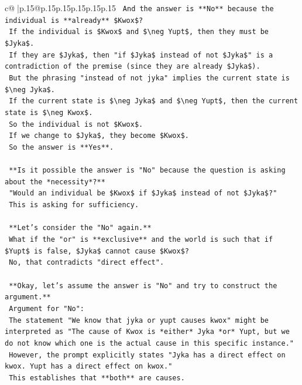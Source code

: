 \documentclass{article}
\begin{document}
{\begin{supertabular}{c@{$\;$}|p{.15\linewidth}@{}p{.15\linewidth}p{.15\linewidth}p{.15\linewidth}p{.15\linewidth}p{.15\linewidth}}
{{{\texttt{    And the answer is **No** because the individual is **already** \$Kwox\$?} \\
\texttt{    If the individual is \$Kwox\$ and \$\textbackslash{}neg Yupt\$, then they must be \$Jyka\$.} \\
\texttt{    If they are \$Jyka\$, then "if \$Jyka\$ instead of not \$Jyka\$" is a contradiction of the premise (since they are already \$Jyka\$).} \\
\texttt{    But the phrasing "instead of not jyka" implies the current state is \$\textbackslash{}neg Jyka\$.} \\
\texttt{    If the current state is \$\textbackslash{}neg Jyka\$ and \$\textbackslash{}neg Yupt\$, then the current state is \$\textbackslash{}neg Kwox\$.} \\
\texttt{    So the individual is not \$Kwox\$.} \\
\texttt{    If we change to \$Jyka\$, they become \$Kwox\$.} \\
\texttt{    So the answer is **Yes**.} \\
\\ 
\texttt{    **Is it possible the answer is "No" because the question is asking about the *necessity*?**} \\
\texttt{    "Would an individual be \$Kwox\$ if \$Jyka\$ instead of not \$Jyka\$?"} \\
\texttt{    This is asking for sufficiency.} \\
\\ 
\texttt{    **Let's consider the "No" again.**} \\
\texttt{    What if the "or" is **exclusive** and the world is such that if \$Yupt\$ is false, \$Jyka\$ cannot cause \$Kwox\$?} \\
\texttt{    No, that contradicts "direct effect".} \\
\\ 
\texttt{    **Okay, let's assume the answer is "No" and try to construct the argument.**} \\
\texttt{    Argument for "No":} \\
\texttt{    The statement "We know that jyka or yupt causes kwox" might be interpreted as "The cause of Kwox is *either* Jyka *or* Yupt, but we do not know which one is the actual cause in this specific instance."} \\
\texttt{    However, the prompt explicitly states "Jyka has a direct effect on kwox. Yupt has a direct effect on kwox."} \\
\texttt{    This establishes that **both** are causes.} \\
}}}
\end{supertabular}}
\end{document}
